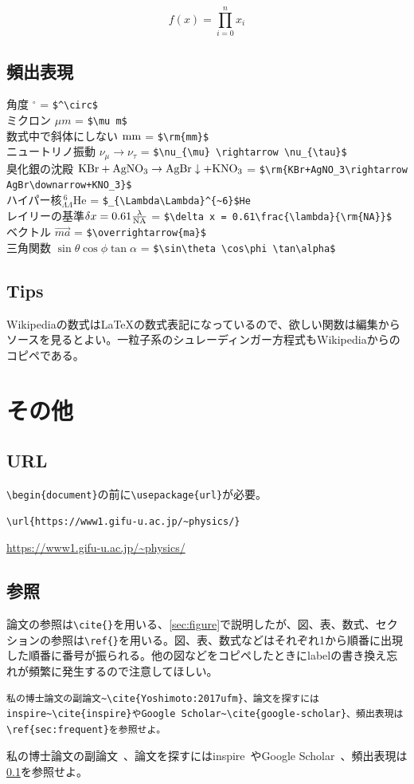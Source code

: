 \documentclass[a4j]{jsarticle}
\begin{document}
\begin{equation}  f(x) = \prod_{i=0}^n x_i \end{equation}
\subsection{頻出表現}
\label{sec:frequent}
\noindent
角度 $^\circ$ = \verb|$^\circ$|\\
ミクロン $\mu m$ = \verb|$\mu m$|\\
数式中で斜体にしない $\rm{mm}$ = \verb|$\rm{mm}$|\\
ニュートリノ振動 $\nu_{\mu} \rightarrow \nu_{\tau}$ = \verb|$\nu_{\mu} \rightarrow \nu_{\tau}$|\\
臭化銀の沈殿 $\rm{KBr+AgNO_3\rightarrow AgBr\downarrow+KNO_3}$ = \verb|$\rm{KBr+AgNO_3\rightarrow AgBr\downarrow+KNO_3}$|\\
ハイパー核$_{\Lambda\Lambda}^{~6}$He = \verb|$_{\Lambda\Lambda}^{~6}$He|\\
レイリーの基準$\delta x = 0.61\frac{\lambda}{\rm{NA}}$ = \verb|$\delta x = 0.61\frac{\lambda}{\rm{NA}}$|\\
ベクトル $\overrightarrow{ma}$ = \verb|$\overrightarrow{ma}$|\\
三角関数 $\sin\theta \cos\phi \tan\alpha$ = \verb|$\sin\theta \cos\phi \tan\alpha$|

\subsection{Tips}
Wikipediaの数式は\LaTeX の数式表記になっているので、欲しい関数は編集からソースを見るとよい。一粒子系のシュレーディンガー方程式もWikipediaからのコピペである。
\newpage
\section{その他}
\subsection{URL}
\verb|\begin{document}|の前に\verb|\usepackage{url}|が必要。
\begin{verbatim}
\url{https://www1.gifu-u.ac.jp/~physics/}
\end{verbatim}
\url{https://www1.gifu-u.ac.jp/~physics/}

\subsection{参照}
論文の参照は\verb|\cite{}|を用いる、\ref{sec:figure}で説明したが、図、表、数式、セクションの参照は\verb|\ref{}|を用いる。図、表、数式などはそれぞれ1から順番に出現した順番に番号が振られる。他の図などをコピペしたときにlabelの書き換え忘れが頻繁に発生するので注意してほしい。
\begin{verbatim}
私の博士論文の副論文~\cite{Yoshimoto:2017ufm}、論文を探すにはinspire~\cite{inspire}やGoogle Scholar~\cite{google-scholar}、頻出表現は\ref{sec:frequent}を参照せよ。
\end{verbatim}
私の博士論文の副論文~\cite{Yoshimoto:2017ufm}、論文を探すにはinspire~\cite{inspire}やGoogle Scholar~\cite{google-scholar}、頻出表現は\ref{sec:frequent}を参照せよ。
\end{document}
